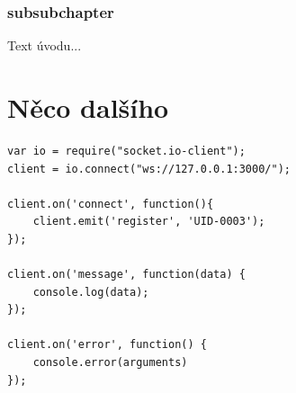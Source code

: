 \documentclass[oneside,12pt,a4paper]{book} %
\begin{document}
\subsection{subsubchapter}
Text úvodu...

\chapter{Něco dalšího}
\begin{verbatim}
var io = require("socket.io-client");
client = io.connect("ws://127.0.0.1:3000/");

client.on('connect', function(){
    client.emit('register', 'UID-0003');
});

client.on('message', function(data) {
    console.log(data);
});

client.on('error', function() {
    console.error(arguments)
});
\end{verbatim}

\end{document}
